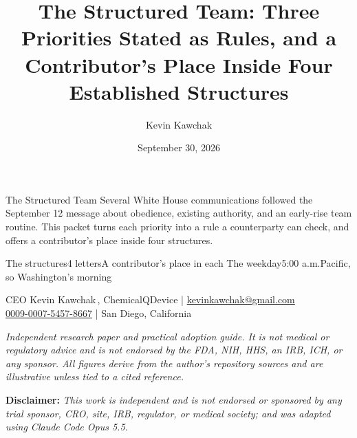 \documentclass[11pt]{article}
\title{The Structured Team: Three Priorities Stated as Rules, and a Contributor's Place Inside Four Established Structures}
\author{Kevin Kawchak}
\date{September 30, 2026}
\begin{document}
\thispagestyle{plain}

%
{The Structured Team}%
{Several White House communications followed the September 12 message about obedience,
existing authority, and an early-rise team routine. This packet turns each priority into a
rule a counterparty can check, and offers a contributor's place inside four structures.}

\vspace{0.15em}

\begin{center}
 \enspace {} \enspace
{} \enspace {} \enspace
{}
\end{center}

\vspace{-0.15em}

%
{The structures}{4 letters}{A contributor's place in each}%
{The weekday}{5:00 a.m.}{Pacific, so Washington's morning}

\vspace{-0.1em}
\apprule{0.9pt}

\begin{center}\small
CEO Kevin Kawchak\,, ChemicalQDevice \;|\;
\href{mailto:kevinkawchak@gmail.com}{kevinkawchak@gmail.com}\\
\href{https://orcid.org/0009-0007-5457-8667}{0009-0007-5457-8667} \;|\;
San Diego, California
\end{center}

\vspace{-0.25em}
\apprule{0.5pt}

\noindent\footnotesize\textit{Independent research paper and practical adoption
guide. It is not medical or regulatory advice and is not endorsed by the FDA,
NIH, HHS, an IRB, ICH, or any sponsor. All figures derive from the author's
repository sources and are illustrative unless tied to a cited
reference.}\normalsize\par

\vspace{0.12em}

\noindent\footnotesize\textbf{Disclaimer:} \textit{This work is independent and
is not endorsed or sponsored by any trial sponsor, CRO, site, IRB, regulator, or
medical society; and was adapted using Claude Code Opus 5.5.}\normalsize\par
\end{document}
